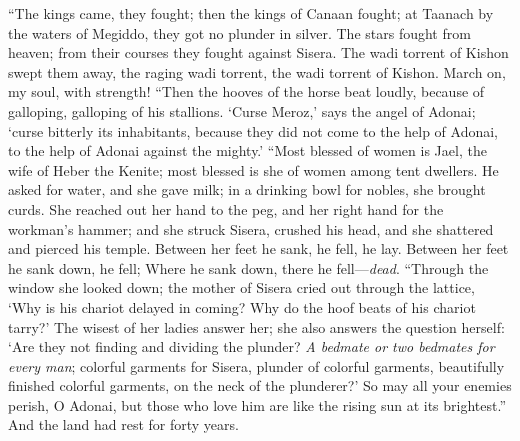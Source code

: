 \begin{biblechapter}
\verse “The kings came, they fought; 
then the kings of Canaan fought; 
at Taanach by the waters of Megiddo, 
they got no plunder in silver.
\verse The stars fought from heaven; 
from their courses they fought against Sisera.
\verse The wadi torrent of Kishon swept them away, 
the raging wadi torrent, 
the wadi torrent of Kishon. 
March on, my soul, with strength!
\verse “Then the hooves of the horse beat loudly, 
because of galloping, galloping of his stallions.
\verse ‘Curse Meroz,’ says the angel of Adonai; 
‘curse bitterly its inhabitants, 
because they did not come to the help of Adonai, 
to the help of Adonai against the mighty.’
\verse “Most blessed of women is Jael, 
the wife of Heber the Kenite; 
most blessed is she of women among tent dwellers.
\verse He asked for water, and she gave milk; 
in a drinking bowl for nobles, she brought curds.
\verse She reached out her hand to the peg, 
and her right hand for the workman’s hammer; 
and she struck Sisera, crushed his head, 
and she shattered and pierced his temple.
\verse Between her feet he sank, he fell, he lay. 
Between her feet he sank down, he fell; 
Where he sank down, there he fell—\textit{dead}.
\verse “Through the window she looked down; 
the mother of Sisera cried out through the lattice, 
‘Why is his chariot delayed in coming? 
Why do the hoof beats of his chariot tarry?’
\verse The wisest of her ladies answer her; 
she also answers the question herself:
\verse ‘Are they not finding and dividing the plunder? 
\textit{A bedmate or two bedmates for every man}; 
colorful garments for Sisera, 
plunder of colorful garments, 
beautifully finished colorful garments, 
on the neck of the plunderer?’
\verse So may all your enemies perish, O Adonai, 
but those who love him are like the rising sun at its brightest.” And the land had rest for forty years.
\end{biblechapter}

